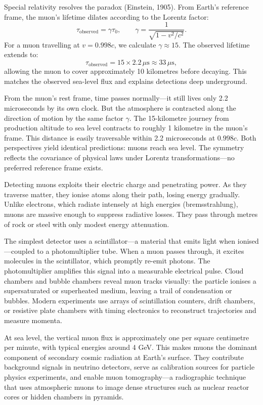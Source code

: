 Special relativity resolves the paradox (Einstein, 1905). From Earth's reference frame, the muon's lifetime dilates according to the Lorentz factor:
\[
\tau_{\text{observed}} = \gamma \tau_0, \qquad \gamma = \frac{1}{\sqrt{1 - v^2/c^2}}.
\]
For a muon travelling at $v = 0.998c$, we calculate $\gamma \approx 15$. The observed lifetime extends to:
\[
\tau_{\text{observed}} = 15 \times 2.2\,\mu\text{s} \approx 33\,\mu\text{s},
\]
allowing the muon to cover approximately 10 kilometres before decaying. This matches the observed sea-level flux and explains detections deep underground.

From the muon's rest frame, time passes normally—it still lives only 2.2 microseconds by its own clock. But the atmosphere is contracted along the direction of motion by the same factor $\gamma$. The 15-kilometre journey from production altitude to sea level contracts to roughly 1 kilometre in the muon's frame. This distance is easily traversable within 2.2 microseconds at $0.998c$. Both perspectives yield identical predictions: muons reach sea level. The symmetry reflects the covariance of physical laws under Lorentz transformations—no preferred reference frame exists.

Detecting muons exploits their electric charge and penetrating power. As they traverse matter, they ionise atoms along their path, losing energy gradually. Unlike electrons, which radiate intensely at high energies (bremsstrahlung), muons are massive enough to suppress radiative losses. They pass through metres of rock or steel with only modest energy attenuation.

The simplest detector uses a scintillator—a material that emits light when ionised—coupled to a photomultiplier tube. When a muon passes through, it excites molecules in the scintillator, which promptly re-emit photons. The photomultiplier amplifies this signal into a measurable electrical pulse. Cloud chambers and bubble chambers reveal muon tracks visually: the particle ionises a supersaturated or superheated medium, leaving a trail of condensation or bubbles. Modern experiments use arrays of scintillation counters, drift chambers, or resistive plate chambers with timing electronics to reconstruct trajectories and measure momenta.

At sea level, the vertical muon flux is approximately one per square centimetre per minute, with typical energies around 4 GeV. This makes muons the dominant component of secondary cosmic radiation at Earth's surface. They contribute background signals in neutrino detectors, serve as calibration sources for particle physics experiments, and enable muon tomography—a radiographic technique that uses atmospheric muons to image dense structures such as nuclear reactor cores or hidden chambers in pyramids.

